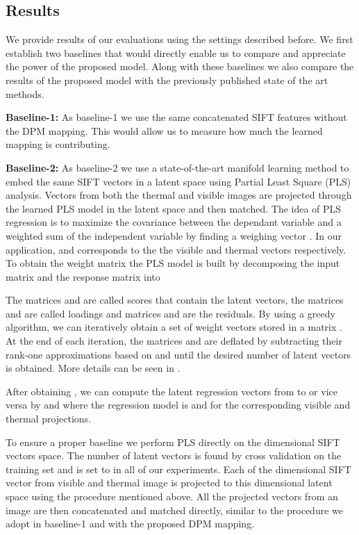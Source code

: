 \documentclass[smallextended,natbib]{svjour3}       \usepackage{graphicx}
\begin{document}
\subsection{Results}
We provide results of our evaluations using the settings described before. We first establish two baselines that would directly enable us to compare and appreciate the power of the proposed model. Along with these baselines we also compare the results of the proposed model with the previously published state of the art methods.
  
\noindent\textbf{Baseline-1:} As baseline-1 we use the same concatenated SIFT features without the DPM mapping. This would allow us to measure how much the learned mapping is contributing.

\noindent\textbf{Baseline-2:} As baseline-2 we use a state-of-the-art manifold learning method to embed the same SIFT vectors in a latent space using Partial Least Square (PLS) analysis. Vectors from both the thermal and visible images are projected through the learned PLS model in the latent space and then matched. The idea of PLS regression is to maximize the covariance between the dependant variable  and a weighted sum of the independent variable  by finding a weighing vector . In our application,  and  corresponds to the the visible and thermal vectors respectively. To obtain the weight matrix the PLS model is built by decomposing the  input matrix  and the response matrix  into

The  matrices  and  are called scores that contain the latent vectors, the  matrices  and  are called loadings and  matrices  and  are the residuals. By using a greedy algorithm, we can iteratively obtain a set of weight vectors stored in a matrix . At the end of each iteration, the matrices  and  are deflated by subtracting their rank-one approximations based on  and  until the desired number of latent vectors  is obtained. More details can be seen in \cite{rosipal2006}.

After obtaining , we can compute the latent regression vectors from  to  or vice versa by  and  where the regression model  is  and  for the corresponding visible and thermal projections.

To ensure a proper baseline we perform PLS directly on the  dimensional SIFT vectors space. The number of latent vectors is found by cross validation on the training set and is set to  in all of our experiments. Each of the  dimensional SIFT vector from visible and thermal image is projected to this  dimensional latent space using the procedure mentioned above. All the projected vectors from an image are then concatenated and matched directly, similar to the procedure we adopt in baseline-1 and with the proposed DPM mapping.
\end{document}
